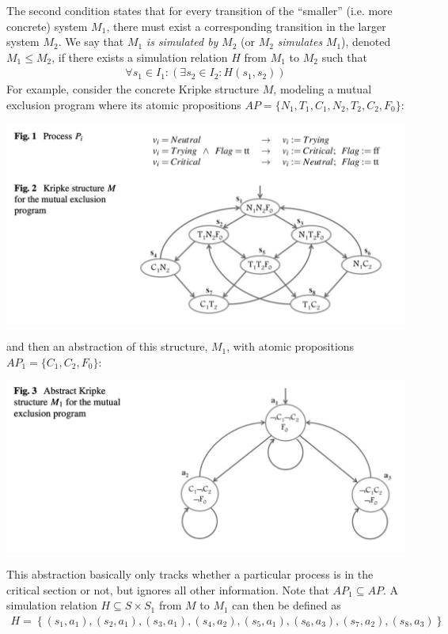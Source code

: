 \documentclass[10pt,a4paper]{article}
\begin{document}
The second condition states that for every transition of the ``smaller'' (i.e. more concrete) system $M_1$, there must exist a corresponding transition in the larger system $M_2$. We say that $M_1$ \textit{is simulated by} $M_2$ (or $M_2$ \textit{simulates} $M_1$), denoted $M_1 \leq M_2$, if there exists a simulation relation $H$ from $M_1$ to $M_2$ such that 
\begin{align*}
    \forall s_1 \in I_1 : (\exists s_2 \in I_2 : H(s_1,s_2))
\end{align*}
For example, consider the concrete Kripke structure $M$, modeling a mutual exclusion program where its atomic propositions $AP=\{N_1,T_1,C_1,N_2,T_2,C_2,F_0\}$:
\begin{center}
    \includegraphics[scale=0.35]{images/concrete-mutex.png}
\end{center}
and then an abstraction of this structure, $M_1$, with atomic propositions $AP_1=\{C_1,C_2,F_0\}$:
\begin{center}
    \includegraphics[scale=0.35]{images/abstract-mutex.png}
\end{center}
This abstraction basically only tracks whether a particular process is in the critical section or not, but ignores all other information. Note that $AP_1 \subseteq AP$. A simulation relation $H \subseteq S \times S_1$ from $M$ to $M_1$ can then be defined as 
\begin{align*}
    H = \left\lbrace (s_1, a_1), (s_2, a_1), (s_3, a_1), (s_4, a_2), (s_5, a_1), (s_6, a_3), (s_7, a_2), (s_8, a_3) \right\rbrace
\end{align*}
\end{document}
